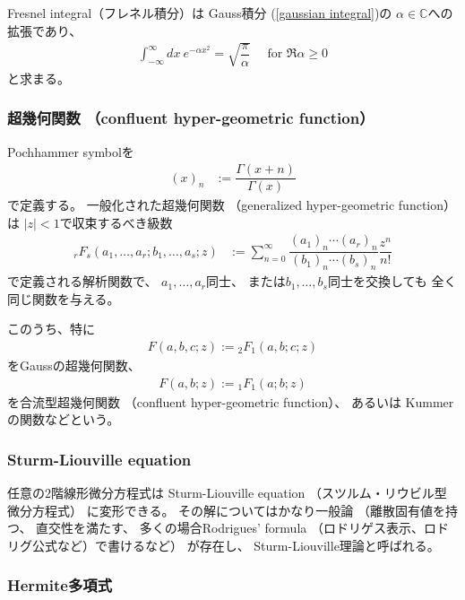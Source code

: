 Fresnel integral（フレネル積分）は
Gauss積分
(\ref{gaussian integral})の
$\alpha \in \mathbb{C}$への拡張であり、
\begin{align}
    \int_{-\infty}^{\infty}
    dx\ e^{- \alpha x^2}
    =
    \sqrt{
        \dfrac{\pi}{\alpha}
    }
    \quad
    \text{ for $\Re \alpha \ge 0$}
\label{fresnel integral}
\end{align}
と求まる。

\subsubsection{
    超幾何関数
    （confluent hyper-geometric function）
}

Pochhammer symbolを
\begin{align}
    (x)_n
    &:=
    \dfrac{\Gamma(x+n)}{\Gamma(x)}
\end{align}
で定義する。
一般化された超幾何関数
（generalized hyper-geometric function）は
$|z| < 1$で収束するべき級数
\begin{align}
    {}_r F_s
    (
        a_1, \dots, a_r;
        b_1, \dots, a_s;
        z
    )
    &:=
    \sum_{n=0}^{\infty}
    \dfrac{ (a_1)_n \cdots (a_r)_n }{
      (b_1)_n \cdots (b_s)_n
    }
    \dfrac{z^n}{n!}  
\end{align}
で定義される解析関数で、
$a_1, \dots, a_r$同士、
または$b_1, \dots, b_s$同士を交換しても
全く同じ関数を与える。

このうち、特に
\begin{align}
    F(a, b, c; z)
    :=
    {}_2 F_1 (a, b; c; z)
\end{align}
をGaussの超幾何関数、
\begin{align}
    F(a, b; z)
    :=
    {}_1 F_1(a; b; z)
\end{align}
を合流型超幾何関数
（confluent hyper-geometric function）、
あるいは
Kummerの関数などという。

\subsubsection{Sturm-Liouville equation}

任意の$2$階線形微分方程式は
Sturm-Liouville equation
（スツルム・リウビル型微分方程式）
に変形できる。
その解についてはかなり一般論
（離散固有値を持つ、
直交性を満たす、
多くの場合Rodrigues' formula
（ロドリゲス表示、ロドリグ公式など）で書けるなど）
が存在し、
Sturm-Liouville理論と呼ばれる。

\subsubsection{Hermite多項式}
\label{hermite polynomial}

